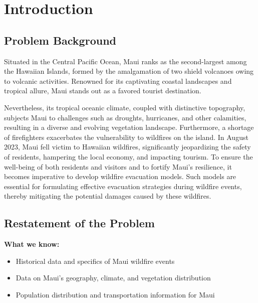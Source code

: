 \documentclass[12pt]{article}  %
\begin{document}
\maketitle  %

\tableofcontents  %


\section{Introduction}

\subsection{Problem Background}
Situated in the Central Pacific Ocean, Maui ranks as the second-largest among the Hawaiian Islands, formed by the amalgamation of two shield volcanoes owing to volcanic activities. Renowned for its captivating coastal landscapes and tropical allure, Maui stands out as a favored tourist destination.

Nevertheless, its tropical oceanic climate, coupled with distinctive topography, subjects Maui to challenges such as droughts, hurricanes, and other calamities, resulting in a diverse and evolving vegetation landscape. Furthermore, a shortage of firefighters exacerbates the vulnerability to wildfires on the island. In August 2023, Maui fell victim to Hawaiian wildfires, significantly jeopardizing the safety of residents, hampering the local economy, and impacting tourism. To ensure the well-being of both residents and visitors and to fortify Maui's resilience, it becomes imperative to develop wildfire evacuation models. Such models are essential for formulating effective evacuation strategies during wildfire events, thereby mitigating the potential damages caused by these wildfires.

\subsection{Restatement of the Problem}

\textbf{What we know:}
\begin{itemize}
	\setlength{\parsep}{0ex} 
	\setlength{\topsep}{2ex} 
	\setlength{\itemsep}{1ex} 
	\item Historical data and specifics of Maui wildfire events
	\item Data on Maui's geography, climate, and vegetation distribution
	\item Population distribution and transportation information for Maui
\end{itemize}
\end{document}
